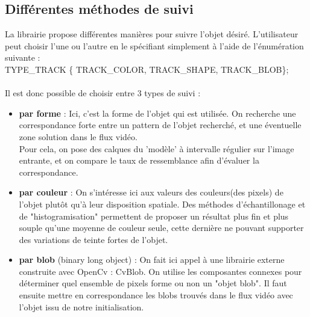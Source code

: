\documentclass{article}
\begin{document}
\subsection{Différentes méthodes de suivi}
La librairie propose différentes manières pour suivre l'objet désiré. L'utilisateur peut choisir l'une ou l'autre en le spécifiant simplement à l'aide de l'énumération suivante :\\
TYPE\_TRACK \{ TRACK\_COLOR, TRACK\_SHAPE, TRACK\_BLOB\};
\paragraph{}
Il est donc possible de choisir entre 3 types de suivi : \\\begin{itemize}
\item {\textbf{par forme} : } Ici, c'est la forme de l'objet qui est utilisée. On recherche une correspondance forte entre un pattern de l'objet recherché, et une éventuelle zone solution dans le flux vidéo. \\
Pour cela, on pose des calques du 'modèle' à intervalle régulier sur l'image entrante, et on compare le taux de ressemblance afin d'évaluer la correspondance.\\
\item {\textbf{par couleur} : } On s'intéresse ici aux valeurs des couleurs(des pixels) de l'objet plutôt qu'à leur disposition spatiale. Des méthodes d'échantillonage et de "histogramisation" permettent de proposer un résultat plus fin et plus souple qu'une moyenne de couleur seule, cette dernière ne pouvant supporter des variations de teinte fortes de l'objet.\\
\item {\textbf{par blob} (binary long object) : } On fait ici appel à une librairie externe construite avec OpenCv : CvBlob. On utilise les composantes connexes pour déterminer quel ensemble de pixels forme ou non un "objet blob". Il faut ensuite mettre en correspondance les blobs trouvés dans le flux vidéo avec l'objet issu de notre initialisation.
\end{itemize}
\end{document}

